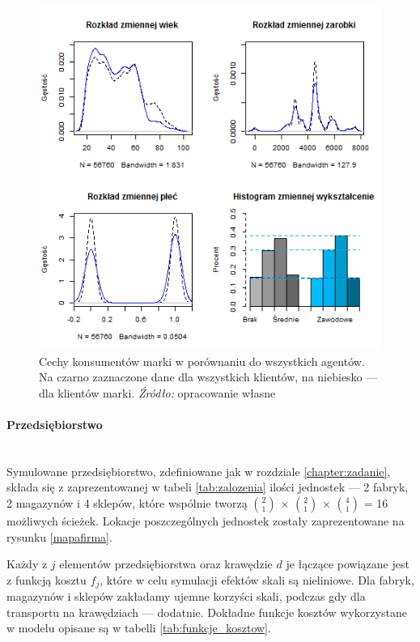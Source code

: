 \documentclass[polish, twoside, 12pt, a4paper]{article}
\theoremstyle{definition}
\theoremstyle{plain}
\theoremstyle{remark}
\begin{document}
\begin{figure}[hbt]
  \centering
    \includegraphics[width=\textwidth]{pictures/profile_klientow.png}
  \captionsetup{margin=10pt,font=small,labelfont=bf,width=.8\textwidth}
  \caption[Cechy konsumentów marki w porównaniu do wszystkich agentów]{Cechy konsumentów marki w porównaniu do wszystkich agentów. Na czarno zaznaczone dane dla wszystkich klientów, na niebiesko --- dla klientów marki. \textit{Źródło:} opracowanie własne}\label{profile}
\end{figure}


\paragraph{Przedsiębiorstwo}\mbox{}\\
Symulowane przedsiębiorstwo, zdefiniowane jak w rozdziale \ref{chapter:zadanie}, składa się z zaprezentowanej w tabeli \ref{tab:zalozenia} ilości jednostek --- 2 fabryk, 2 magazynów i 4 sklepów, które wspólnie tworzą  $2\choose 1 $ $ \times $ $2\choose 1 $ $ \times $ $4\choose 1 $ = 16 możliwych ścieżek. Lokacje poszczególnych jednostek zostały zaprezentowane na rysunku \ref{mapafirma}.

Każdy z $j$ elementów przedsiębiorstwa oraz krawędzie $d$ je łączące powiązane jest z funkcją kosztu $f_j$, które w celu symulacji efektów skali są nieliniowe. Dla fabryk, magazynów i sklepów zakładamy ujemne korzyści skali, podczas gdy dla transportu na krawędziach --- dodatnie. Dokładne funkcje kosztów wykorzystane w modelu opisane są w tabelli \ref{tab:funkcje_kosztow}. 
\end{document}
